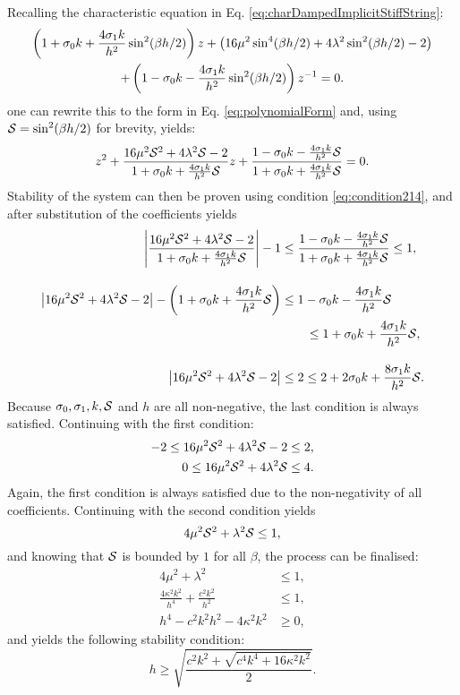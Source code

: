 Recalling the characteristic equation in Eq. \eqref{eq:charDampedImplicitStiffString}:
\begin{gather*}
    \left(1+\sz k + \frac{4\so k}{h^2}\sin^2(\beta h/2)\right)z + \left(16\mu^2\sin^4(\beta h/2)+4\lambda^2\sin^2(\beta h/2) - 2\right)\nonumber\\
    + \left(1-\sz k - \frac{4\so k}{h^2}\sin^2(\beta h/2)\right)z^{-1} = 0.
\end{gather*}
one can rewrite this to the form in Eq. \eqref{eq:polynomialForm} and, using $\S = \sin^2(\beta h / 2)$ for brevity, yields:
\begin{equation*}
z^2 + \frac{16\mu^2\S^2+4\lambda^2\S - 2}{1+\sz k + \frac{4\so k}{h^2}\S}z+\frac{1-\sz k - \frac{4\so k}{h^2}\S}{1+\sz k + \frac{4\so k}{h^2}\S} = 0.
\end{equation*}
Stability of the system can then be proven using condition \eqref{eq:condition214}, and after substitution of the coefficients yields
\begin{align*}
\left|\frac{16\mu^2\S^2+4\lambda^2\S - 2}{1+\sz k + \frac{4\so k}{h^2}\S} \right|-1 &\leq \frac{1-\sz k - \frac{4\so k}{h^2}\S}{1+\sz k + \frac{4\so k}{h^2}\S}\leq 1,\\[1em]
\left|16\mu^2\S^2+4\lambda^2\S - 2 \right| - \left(1+\sz k + \frac{4\so k}{h^2}\S\right) &\leq 1-\sz k - \frac{4\so k}{h^2}\S\\
&\qquad\leq 1+\sz k + \frac{4\so k}{h^2}\S,\\[1em]
\left|16\mu^2\S^2+4\lambda^2\S - 2 \right|&\leq 2 \leq 2+2\sz k + \frac{8\so k}{h^2}\S.
\end{align*} 
Because $\sz, \so, k, \S$ and $h$ are all non-negative, the last condition is always satisfied. Continuing with the first condition:
\begin{align*}
    -2\leq 16\mu^2\S^2+4\lambda^2\S - 2 &\leq 2,\\
    0\leq 16\mu^2\S^2+4\lambda^2\S &\leq 4.
\end{align*}
Again, the first condition is always satisfied due to the non-negativity of all coefficients. Continuing with the second condition yields
\begin{equation*}
    4\mu^2\S^2+\lambda^2\S \leq 1,
\end{equation*} 
and knowing that $\S$ is bounded by $1$ for all $\beta$, the process can be finalised:
\begin{align*}
    4\mu^2+\lambda^2 &\leq 1,\\
    \frac{4\kappa^2k^2}{h^4}+\frac{c^2k^2}{h^2} &\leq 1,\\
    h^4 - c^2k^2h^2 - 4\kappa^2k^2 &\geq 0,
\end{align*}
and yields the following stability condition:
\begin{equation*}
    h \geq \sqrt{\frac{c^2k^2 + \sqrt{c^4k^4 + 16\kappa^2k^2}}{2}}.
\end{equation*}
